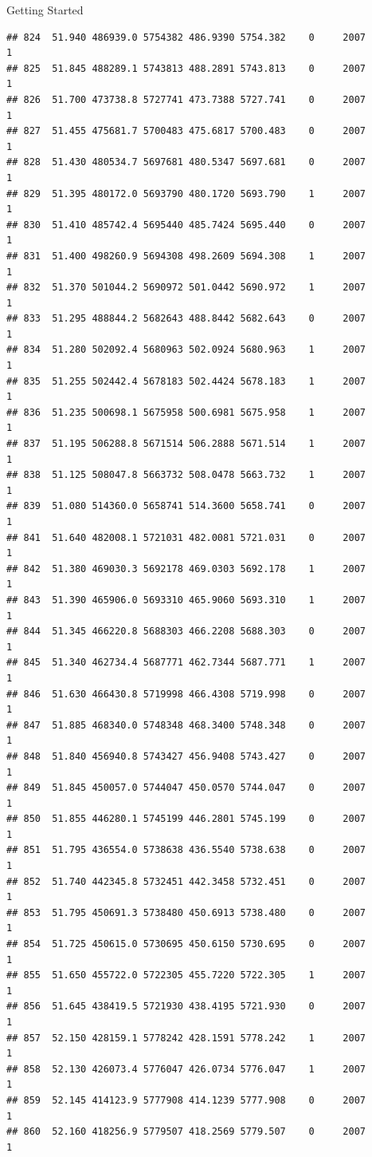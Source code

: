 \documentclass[
  ignorenonframetext,
]{beamer}
\begin{document}
\begin{frame}[fragile]{Getting Started}
\begin{verbatim}
## 824  51.940 486939.0 5754382 486.9390 5754.382    0     2007        1
## 825  51.845 488289.1 5743813 488.2891 5743.813    0     2007        1
## 826  51.700 473738.8 5727741 473.7388 5727.741    0     2007        1
## 827  51.455 475681.7 5700483 475.6817 5700.483    0     2007        1
## 828  51.430 480534.7 5697681 480.5347 5697.681    0     2007        1
## 829  51.395 480172.0 5693790 480.1720 5693.790    1     2007        1
## 830  51.410 485742.4 5695440 485.7424 5695.440    0     2007        1
## 831  51.400 498260.9 5694308 498.2609 5694.308    1     2007        1
## 832  51.370 501044.2 5690972 501.0442 5690.972    1     2007        1
## 833  51.295 488844.2 5682643 488.8442 5682.643    0     2007        1
## 834  51.280 502092.4 5680963 502.0924 5680.963    1     2007        1
## 835  51.255 502442.4 5678183 502.4424 5678.183    1     2007        1
## 836  51.235 500698.1 5675958 500.6981 5675.958    1     2007        1
## 837  51.195 506288.8 5671514 506.2888 5671.514    1     2007        1
## 838  51.125 508047.8 5663732 508.0478 5663.732    1     2007        1
## 839  51.080 514360.0 5658741 514.3600 5658.741    0     2007        1
## 841  51.640 482008.1 5721031 482.0081 5721.031    0     2007        1
## 842  51.380 469030.3 5692178 469.0303 5692.178    1     2007        1
## 843  51.390 465906.0 5693310 465.9060 5693.310    1     2007        1
## 844  51.345 466220.8 5688303 466.2208 5688.303    0     2007        1
## 845  51.340 462734.4 5687771 462.7344 5687.771    1     2007        1
## 846  51.630 466430.8 5719998 466.4308 5719.998    0     2007        1
## 847  51.885 468340.0 5748348 468.3400 5748.348    0     2007        1
## 848  51.840 456940.8 5743427 456.9408 5743.427    0     2007        1
## 849  51.845 450057.0 5744047 450.0570 5744.047    0     2007        1
## 850  51.855 446280.1 5745199 446.2801 5745.199    0     2007        1
## 851  51.795 436554.0 5738638 436.5540 5738.638    0     2007        1
## 852  51.740 442345.8 5732451 442.3458 5732.451    0     2007        1
## 853  51.795 450691.3 5738480 450.6913 5738.480    0     2007        1
## 854  51.725 450615.0 5730695 450.6150 5730.695    0     2007        1
## 855  51.650 455722.0 5722305 455.7220 5722.305    1     2007        1
## 856  51.645 438419.5 5721930 438.4195 5721.930    0     2007        1
## 857  52.150 428159.1 5778242 428.1591 5778.242    1     2007        1
## 858  52.130 426073.4 5776047 426.0734 5776.047    1     2007        1
## 859  52.145 414123.9 5777908 414.1239 5777.908    0     2007        1
## 860  52.160 418256.9 5779507 418.2569 5779.507    0     2007        1

\end{verbatim}
\end{frame}
\end{document}
